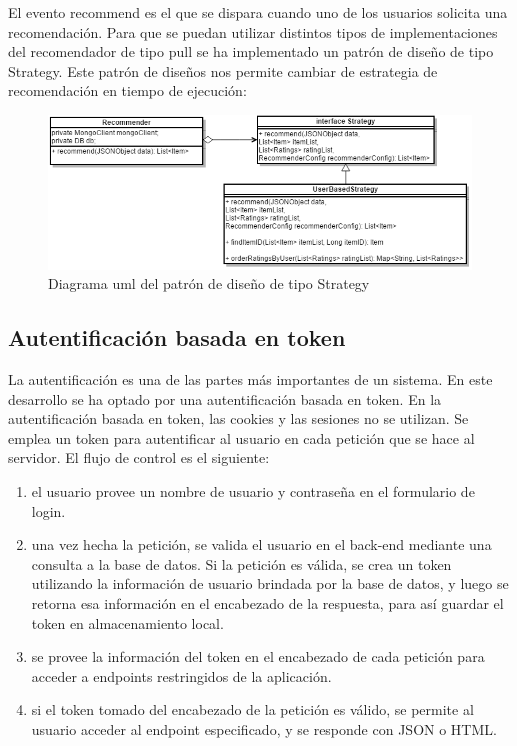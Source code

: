 El evento recommend es el que se dispara cuando uno de los usuarios solicita una recomendación. Para que se puedan utilizar distintos tipos de implementaciones del recomendador de tipo pull se ha implementado un patrón de diseño de tipo Strategy. Este patrón de diseños nos permite cambiar de estrategia de recomendación en tiempo de ejecución:

\begin{figure}[H]
\includegraphics[scale=0.65]{imagenes/uml.png}
\caption{Diagrama uml del patrón de diseño de tipo Strategy}
\label{diagramaUMLStrategy}
\end{figure}

\subsection{Autentificación basada en token}

La autentificación es una de las partes más importantes de un sistema. En este desarrollo se ha optado por una autentificación basada en token. En la autentificación basada en token, las cookies y las sesiones no se utilizan. Se emplea un token para autentificar al usuario en cada petición que se hace al servidor. El flujo de control es el siguiente:
\begin{enumerate}[1.]
	\item el usuario provee un nombre de usuario y contraseña en el formulario de login.
	\item una vez hecha la petición, se valida el usuario en el back-end mediante una consulta a la base de datos. Si la petición es válida, se crea un token utilizando la información de usuario brindada por la base de datos, y luego se retorna esa información en el encabezado de la respuesta, para así guardar el token en almacenamiento local.
	\item se provee la información del token en el encabezado de cada petición para acceder a endpoints restringidos de la aplicación.
	\item si el token tomado del encabezado de la petición es válido, se permite al usuario acceder al endpoint especificado, y se responde con JSON o HTML.
\end{enumerate}

